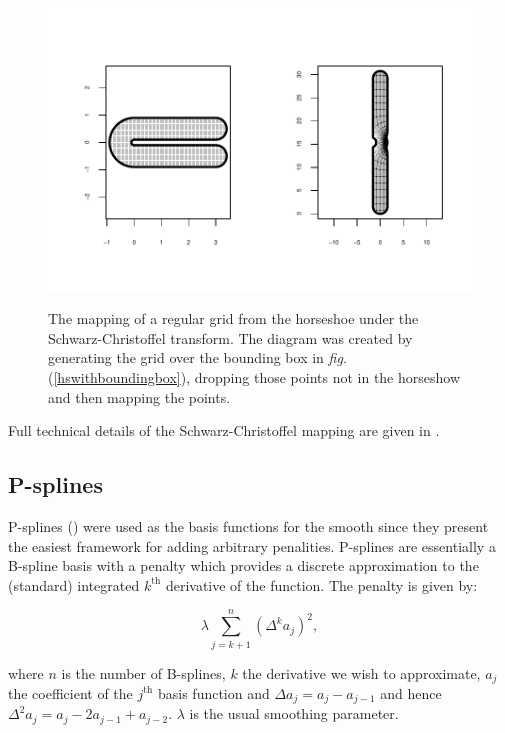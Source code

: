 \documentclass[a4paper,10pt]{amsart}
\newcommand{\sch}{Schwarz-Christoffel }
\newcommand{\fig}[1]{\emph{fig.} (\ref{#1})}
\begin{document}
\begin{figure}
\centering
\includegraphics[trim=0.5in 0.5in 0in 0in]{figs/hsgridmapping.pdf} \\
\caption{The mapping of a regular grid from the horseshoe under the \sch transform. The diagram was created by generating the grid over the bounding box in \fig{hswithboundingbox}, dropping those points not in the horseshow and then mapping the points.}
\label{hsgridmapping}
\end{figure}

Full technical details of the \sch mapping are given in \cite{miller08}.


\subsection{P-splines}
P-splines (\cite{eilersmarx96}) were used as the basis functions for the smooth since they present the easiest framework for adding arbitrary penalities. P-splines are essentially a B-spline basis with a penalty which provides a discrete approximation to the (standard) integrated $k^\text{th}$ derivative of the function. The penalty is given by:

\begin{equation*}
\lambda \sum_{j=k+1}^n (\Delta^k a_j)^2,
\end{equation*}

where $n$ is the number of B-splines, $k$ the derivative we wish to approximate, $a_j$ the coefficient of the $j^\text{th}$ basis function and $\Delta a_j = a_j-a_{j-1}$ and hence $\Delta^2 a_j = a_j-2a_{j-1}+a_{j-2}$. $\lambda$ is the usual smoothing parameter. 
\end{document}
